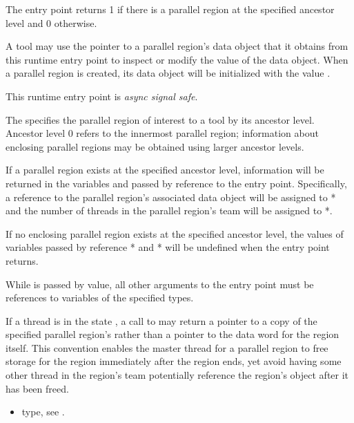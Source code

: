 The entry point returns 1 if there is a parallel region at the
specified ancestor level and 0 otherwise.

A tool may use the pointer to a parallel region's data object that it
obtains from this runtime entry point to inspect or modify the value
of the data object.  When a parallel region is created, its data
object will be initialized with the value .

This runtime entry point is \emph{async signal safe}.

\argdesc

The \callbackarg{}  specifies the parallel region
of interest to a tool by its ancestor level.  Ancestor level 0 refers
to the innermost parallel region; information about enclosing parallel
regions may be obtained using larger ancestor levels.  

If a parallel region exists at the specified ancestor level,
information will be returned in the variables  and
 passed by reference to the entry point.
Specifically, a reference to the parallel region's associated data
object will be assigned to * and the number of
threads in the parallel region's team will be assigned to
*.

If no enclosing parallel region exists at the specified ancestor
level, the values of variables passed by reference
* and * will be undefined when the
entry point returns.

\constraints
While \callbackarg{}  is passed by
value, all other arguments to the entry point must be references
to variables of the specified types.


\restrictions
If a thread is in the state ,
a call to 
may return a pointer to a copy of the specified parallel region's 
rather than a pointer to the data word for the region itself. This convention enables the master thread
for a parallel region to free storage for the region immediately after the region ends, yet
avoid having some other thread in the region's team
potentially reference the region's  object after it has been freed.

\crossreferences
\begin{itemize}
\item {} type, see .
\end{itemize}

